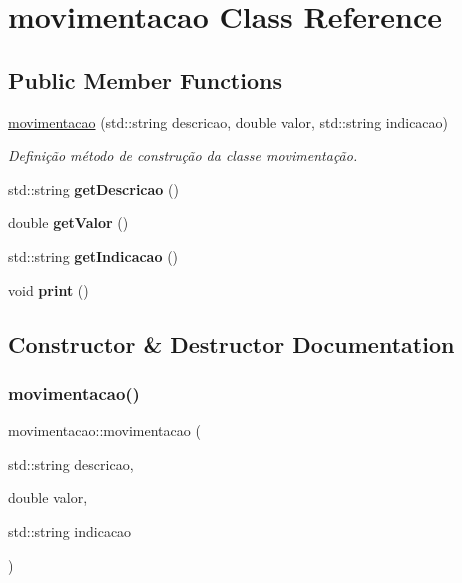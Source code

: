 \hypertarget{classmovimentacao}{}\section{movimentacao Class Reference}
\label{classmovimentacao}
\subsection*{Public Member Functions}
\begin{DoxyCompactItemize}
\item 
\mbox{\hyperlink{classmovimentacao_a2040c4f41fcf8679566dfa320883c33d}{movimentacao}} (std\+::string descricao, double valor, std\+::string indicacao)
\begin{DoxyCompactList}\small\item\em Definição método de construção da classe movimentação. \end{DoxyCompactList}\item 
\mbox{\label{classmovimentacao_ad61189a54a8eee2bcfdfd615e43ff1b5}} 
std\+::string {\bfseries get\+Descricao} ()
\item 
\mbox{\label{classmovimentacao_a822eca4e214df599f64f9b1e47416d94}} 
double {\bfseries get\+Valor} ()
\item 
\mbox{\label{classmovimentacao_ad0b41f4116a95285335fb1af79621556}} 
std\+::string {\bfseries get\+Indicacao} ()
\item 
\mbox{\label{classmovimentacao_a1df2e8bc9f988a0f67825161c9c30fd8}} 
void {\bfseries print} ()
\end{DoxyCompactItemize}


\subsection{Constructor \& Destructor Documentation}
\mbox{\label{classmovimentacao_a2040c4f41fcf8679566dfa320883c33d}} 
\subsubsection{\texorpdfstring{movimentacao()}{movimentacao()}}
{\footnotesize\ttfamily movimentacao\+::movimentacao (\begin{DoxyParamCaption}\item[{std\+::string}]{descricao,  }\item[{double}]{valor,  }\item[{std\+::string}]{indicacao }\end{DoxyParamCaption})}



